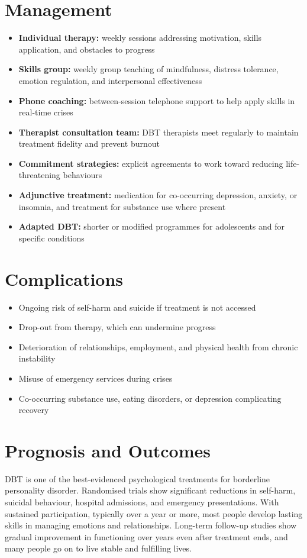 \section*{Management}
\begin{itemize}
    \item \textbf{Individual therapy:} weekly sessions addressing motivation, skills application, and obstacles to progress
    \item \textbf{Skills group:} weekly group teaching of mindfulness, distress tolerance, emotion regulation, and interpersonal effectiveness
    \item \textbf{Phone coaching:} between-session telephone support to help apply skills in real-time crises
    \item \textbf{Therapist consultation team:} DBT therapists meet regularly to maintain treatment fidelity and prevent burnout
    \item \textbf{Commitment strategies:} explicit agreements to work toward reducing life-threatening behaviours
    \item \textbf{Adjunctive treatment:} medication for co-occurring depression, anxiety, or insomnia, and treatment for substance use where present
    \item \textbf{Adapted DBT:} shorter or modified programmes for adolescents and for specific conditions
\end{itemize}

\section*{Complications}
\begin{itemize}
    \item Ongoing risk of self-harm and suicide if treatment is not accessed
    \item Drop-out from therapy, which can undermine progress
    \item Deterioration of relationships, employment, and physical health from chronic instability
    \item Misuse of emergency services during crises
    \item Co-occurring substance use, eating disorders, or depression complicating recovery
\end{itemize}

\section*{Prognosis and Outcomes}
DBT is one of the best-evidenced psychological treatments for borderline personality disorder. Randomised trials show significant reductions in self-harm, suicidal behaviour, hospital admissions, and emergency presentations. With sustained participation, typically over a year or more, most people develop lasting skills in managing emotions and relationships. Long-term follow-up studies show gradual improvement in functioning over years even after treatment ends, and many people go on to live stable and fulfilling lives.


